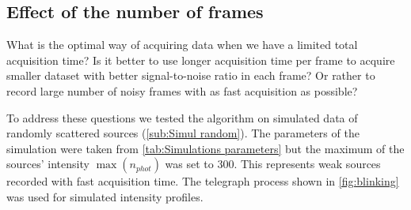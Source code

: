 \subsection{Effect of the number of frames\label{sub:results - number of frames}}
%

What is the optimal way of acquiring data when we have a limited total acquisition time? Is it better to use longer acquisition time per frame to acquire smaller dataset with better signal-to-noise ratio in each frame? Or rather to record large number of noisy frames with as fast acquisition as possible? 

To address these questions we tested the \inmf{} algorithm on simulated data of randomly scattered sources (\autoref{sub:Simul random}). The parameters of the simulation were taken from \autoref{tab:Simulations parameters} but the maximum of the sources' intensity $\max(n_{phot})$ was set to 300. This represents weak sources recorded with fast acquisition time. The telegraph process shown in \autoref{fig:blinking}\ccc{} was used for simulated intensity profiles. 


